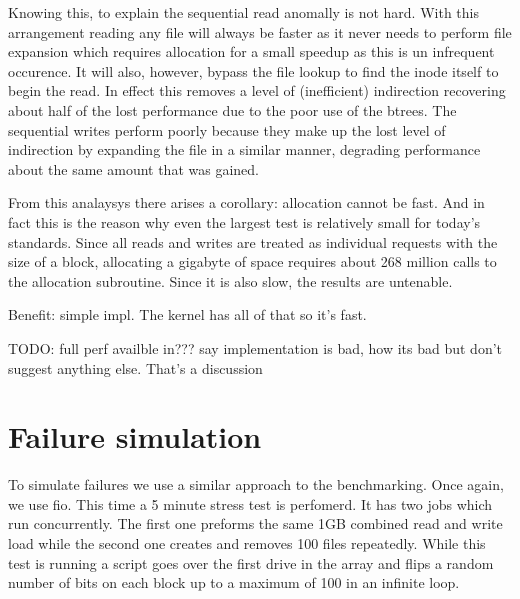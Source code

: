         Knowing this, to explain the sequential read anomally is not hard. With
        this arrangement reading any file will always be faster as it never
        needs to perform file expansion which requires allocation for a small
        speedup as this is un infrequent occurence. It will also, however,
        bypass the file lookup to find the inode itself to begin the read. In
        effect this removes a level of (inefficient) indirection recovering
        about half of the lost performance due to the poor use of the btrees.
        The sequential writes perform poorly because they make up the lost
        level of indirection by expanding the file in a similar manner,
        degrading performance about the same amount that was gained.

        From this analaysys there arises a corollary: allocation cannot be
        fast. And in fact this is the reason why even the largest test is
        relatively small for today's standards. Since all reads and writes are
        treated as individual requests with the size of a block, allocating a
        gigabyte of space requires about 268 million calls to the allocation
        subroutine. Since it is also slow, the results are untenable.

        Benefit: simple impl. The kernel has all of that so it's fast.


        TODO: full perf availble in???
        say implementation is bad, how its bad but don't suggest anything else. That's a discussion


    \section{Failure simulation}

        To simulate failures we use a similar approach to the benchmarking.
        Once again, we use fio. This time a 5 minute stress test is perfomerd.
        It has two jobs which run concurrently. The first one preforms the same
        1GB combined read and write load while the second one creates and
        removes 100 files repeatedly. While this test is running a script goes
        over the first drive in the array and flips a random number of bits on
        each block up to a maximum of 100 in an infinite loop.


